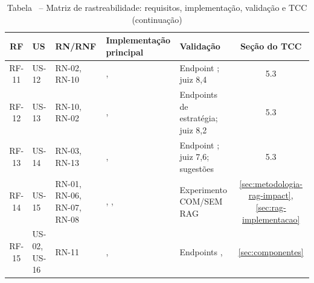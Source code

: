 \begin{table}[H]
\centering
\setlength{\tabcolsep}{2pt}
\caption*{Tabela \thetable\ -- Matriz de rastreabilidade: requisitos, implementação, validação e TCC (continuação)}
\begin{tabularx}{\textwidth}{|C|L{1.6cm}|L{2.5cm}|Y|Y|C|}
\hline
\textbf{RF} & \textbf{US} & \textbf{RN/RNF} & \textbf{Implemen\-tação principal} & \textbf{Validação} & \textbf{Seção do TCC} \\
\hline
RF-11 & US-12 & RN-02, RN-10 & \texttt{}, \texttt{} & Endpoint \texttt{}; juiz 8,4 & 5.3 \\
\hline
RF-12 & US-13 & RN-10, RN-02 & \texttt{}, \texttt{} & Endpoints de estratégia; juiz 8,2 & 5.3 \\
\hline
RF-13 & US-14 & RN-03, RN-13 & \texttt{}, \texttt{} & Endpoint \texttt{}; juiz 7,6; sugestões & 5.3 \\
\hline
RF-14 & US-15 & RN-01, RN-06, RN-07, RN-08 & \texttt{}, \texttt{}, \texttt{} & Experimento COM/SEM RAG & \ref{sec:metodologia-rag-impact}, \ref{sec:rag-implementacao} \\
\hline
RF-15 & US-02, US-16 & RN-11 & \texttt{}, \texttt{} & Endpoints \texttt{}, \texttt{} & \ref{sec:componentes} \\
\hline
\end{tabularx}
\end{table}

